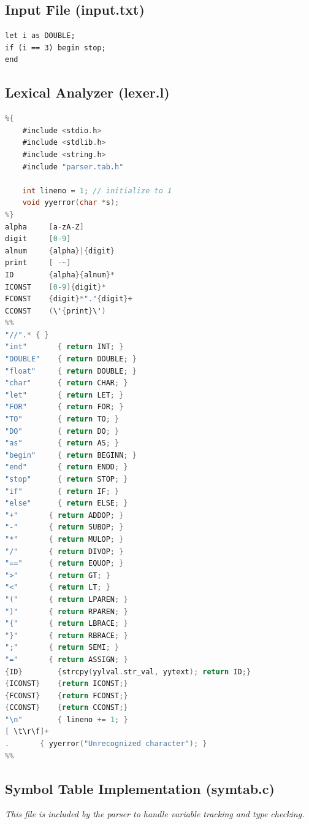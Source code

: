 \documentclass[12pt,a4paper]{article}
\begin{document}
\subsection{Input File (input.txt)}
\begin{lstlisting}[caption={Complete input file}]
let i as DOUBLE;
if (i == 3) begin stop;
end
\end{lstlisting}

\subsection{Lexical Analyzer (lexer.l)}

\begin{lstlisting}[language=C, caption={Flex specification for lexical analysis}]
%option noyywrap
%{
    #include <stdio.h>
    #include <stdlib.h>
    #include <string.h>
    #include "parser.tab.h"
    
    int lineno = 1; // initialize to 1
    void yyerror(char *s);
%}
alpha     [a-zA-Z]
digit     [0-9]
alnum     {alpha}|{digit}
print     [ -~]
ID        {alpha}{alnum}*
ICONST    [0-9]{digit}*
FCONST    {digit}*"."{digit}+
CCONST    (\'{print}\')
%%
"//".* { } 
"int"       { return INT; }
"DOUBLE"    { return DOUBLE; }
"float"     { return DOUBLE; } 
"char"      { return CHAR; }  
"let"       { return LET; }
"FOR"       { return FOR; }
"TO"        { return TO; }
"DO"        { return DO; }
"as"        { return AS; }
"begin"     { return BEGINN; }
"end"       { return ENDD; }
"stop"      { return STOP; }
"if"        { return IF; }
"else"      { return ELSE; }
"+"       { return ADDOP; }
"-"       { return SUBOP; }
"*"       { return MULOP; }
"/"       { return DIVOP; }
"=="      { return EQUOP; }
">"       { return GT; }
"<"       { return LT; }
"("       { return LPAREN; }
")"       { return RPAREN; }
"{"       { return LBRACE; }
"}"       { return RBRACE; }
";"       { return SEMI; }
"="       { return ASSIGN; }
{ID}        {strcpy(yylval.str_val, yytext); return ID;}
{ICONST}    {return ICONST;}
{FCONST}    {return FCONST;}
{CCONST}    {return CCONST;}
"\n"        { lineno += 1; }
[ \t\r\f]+  
.       { yyerror("Unrecognized character"); }
%%
\end{lstlisting}

\subsection{Symbol Table Implementation (symtab.c)}
\textit{This file is included by the parser to handle variable tracking and type checking.}
\end{document}
